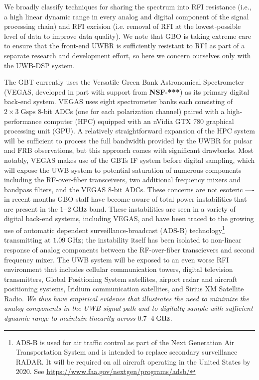 \documentclass[10pt]{myNSF}
\begin{document}
We broadly classify techniques for sharing the spectrum into RFI
resistance (i.e., a high linear dynamic range in every analog and
digital component of the signal processing chain) and RFI excision
(i.e. removal of RFI at the lowest-possible level of data to improve
data quality).  We note that GBO is taking extreme care to ensure that
the front-end UWBR is sufficiently resistant to RFI as part of a
separate research and development effort, so here we concern ourselves
only with the UWB-DSP system.

 The GBT currently uses the Versatile
Green Bank Astronomical Spectrometer (VEGAS, developed in part with
support from \textbf{NSF-***}) as its primary digital back-end system.
VEGAS uses eight spectrometer banks each consisting of $2 \times 3\;
\mathrm{Gsps}$ 8-bit ADCs (one for each polarization channel) paired
with a high-performance computer (HPC) equipped with an nVidia GTX 780
graphical processing unit (GPU).  A relatively straightforward
expansion of the HPC system will be sufficient to process the full
bandwidth provided by the UWBR for pulsar and FRB observations, but
this approach comes with significant drawbacks.  Most notably, VEGAS
makes use of the GBTs IF system before digital sampling, which will
expose the UWB system to potential saturation of numerous components
including the RF-over-fiber transceivers, two additional frequency
mixers and bandpass filters, and the VEGAS 8-bit ADCs.  These concerns
are not esoteric ---- in recent months GBO staff have become aware of
total power instabilities that are present in the $1$--$2\; \textrm{GHz}$
band.  These instabilities are seen in a variety of digital back-end
systems, including VEGAS, and have been traced to the growing use of
automatic dependent surveillance-broadcast (ADS-B)
technology\footnote{ADS-B is used for air traffic control as part of
  the Next Generation Air Transportation System and is intended to
  replace secondary surveillance RADAR.  It will be required on all
  aircraft operating in the United States by 2020.  See
  \url{https://www.faa.gov/nextgen/programs/adsb/}} transmitting at
$1.09\; \textrm{GHz}$; the instability itself has been isolated to non-linear
response of analog components between the RF-over-fiber transcievers
and second frequency mixer.  The UWB system will be exposed to an even
worse RFI environment that includes cellular communication towers,
digital television transmitters, Global Positioning System satellites,
airport radar and aircraft positioning systems, Iridium communication
satellites, and Sirius XM Satellite Radio.  \emph{We thus have
  empirical evidence that illustrates the need to minimize the analog
  components in the UWB signal path and to digitally sample with
  sufficient dynamic range to maintain linearity across $0.7$--$4\;
  \textrm{GHz}$}.
\end{document}
